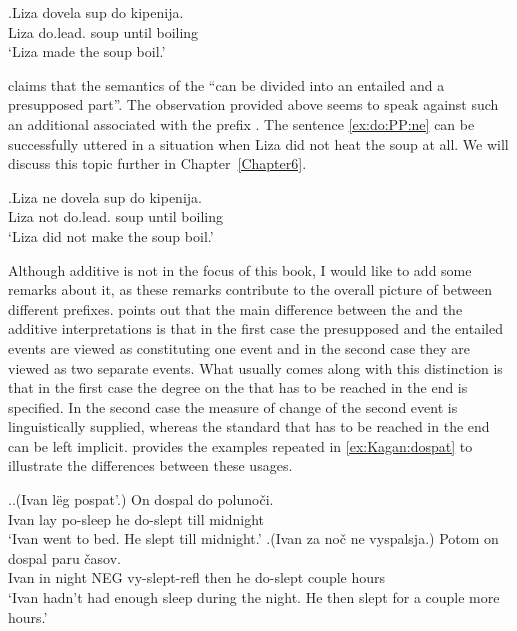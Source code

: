 \exg.\label{ex:do:PP}Liza dovela sup do kipenija.\\
Liza do.lead. soup until boiling\\
\trans `Liza made the soup boil.'

\citet[75]{Kagan:book} claims that the semantics of the   ``can be divided into an entailed and a presupposed part''. The observation provided above seems to speak against such an additional  associated with the prefix . The sentence \ref{ex:do:PP:ne} can be successfully uttered in a situation when Liza did not heat the soup at all. We will discuss this topic further in Chapter~\ref{Chapter6}.

\exg.\label{ex:do:PP:ne}Liza ne dovela sup do kipenija.\\
Liza not do.lead. soup until boiling\\
\trans `Liza did not make the soup boil.'

Although additive  is not in the focus of this book, I would like to add some remarks about it, as these remarks contribute to the overall picture of  between different prefixes. \citet[79]{Kagan:book} points out that the main difference between the  and the additive interpretations is that in the first case the presupposed and the entailed events are viewed as constituting one event and in the second case they are viewed as two separate events. What usually comes along with this distinction is that in the first case the degree on the  that has to be reached in the end is specified. In the second case the measure of change of the second event is linguistically supplied, whereas the  standard that has to be reached in the end can be left implicit. \citet[79]{Kagan:book} provides the examples repeated in \ref{ex:Kagan:dospat} to illustrate the differences between these usages.

\ex.\label{ex:Kagan:dospat}\ag.\label{ex:Kagan:dospat:1}(Ivan l\"{e}g pospat'.) On dospal do poluno\v{c}i.\\
Ivan lay po-sleep he do-slept till midnight\\
\trans `Ivan went to bed. He slept till midnight.'
\bg.\label{ex:Kagan:dospat:2}(Ivan za no\v{c} ne vyspalsja.) Potom on dospal paru \v{c}asov.\\
Ivan in night NEG vy-slept-refl then he do-slept couple hours\\
\trans `Ivan hadn't had enough sleep during the night. He then slept for a couple more hours.'

